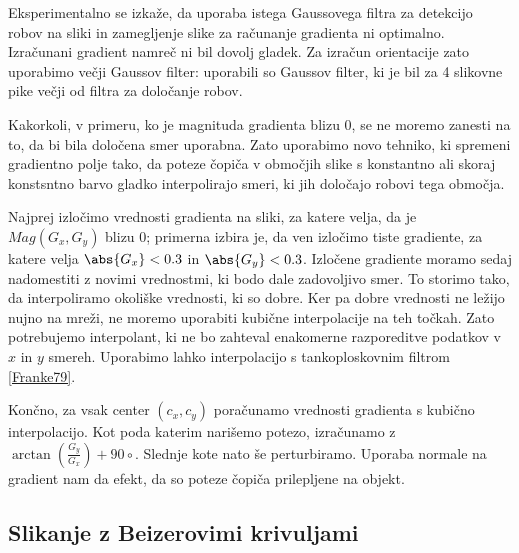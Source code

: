 Eksperimentalno se izkaže, da uporaba istega Gaussovega filtra za detekcijo robov na sliki in zamegljenje slike za računanje gradienta ni optimalno. Izračunani gradient namreč ni bil dovolj gladek. Za izračun orientacije zato uporabimo večji Gaussov filter: uporabili so Gaussov filter, ki je bil za 4 slikovne pike večji od filtra za določanje robov.

Kakorkoli, v primeru, ko je magnituda gradienta blizu 0, se ne moremo zanesti na to, da bi bila določena smer uporabna. Zato uporabimo novo tehniko, ki spremeni gradientno polje tako, da poteze čopiča v območjih slike s konstantno ali skoraj konstsntno barvo gladko interpolirajo smeri, ki jih določajo robovi tega območja.

Najprej izločimo vrednosti gradienta na sliki, za katere velja, da je $Mag(G_x, G_y)$ blizu 0; primerna izbira je, da ven izločimo tiste gradiente, za katere velja $\abs{G_x} < 0.3$ in $\abs{G_y} < 0.3$. Izločene gradiente moramo sedaj nadomestiti z novimi vrednostmi, ki bodo dale zadovoljivo smer. To storimo tako, da interpoliramo okoliške vrednosti, ki so dobre. Ker pa dobre vrednosti ne ležijo nujno na mreži, ne moremo uporabiti kubične interpolacije na teh točkah. Zato potrebujemo interpolant, ki ne bo zahteval enakomerne razporeditve podatkov v $x$ in $y$ smereh. Uporabimo lahko interpolacijo s tankoploskovnim filtrom \ref{Franke79}.

Končno, za vsak center $(c_x, c_y)$ poračunamo vrednosti gradienta s kubično interpolacijo. Kot poda katerim narišemo potezo, izračunamo z $\arctan(\frac{G_y}{G_x}) + 90\circ$. Slednje kote nato še perturbiramo. Uporaba normale na gradient nam da efekt, da so poteze čopiča prilepljene na objekt.
\subsection{Slikanje z Beizerovimi krivuljami}
